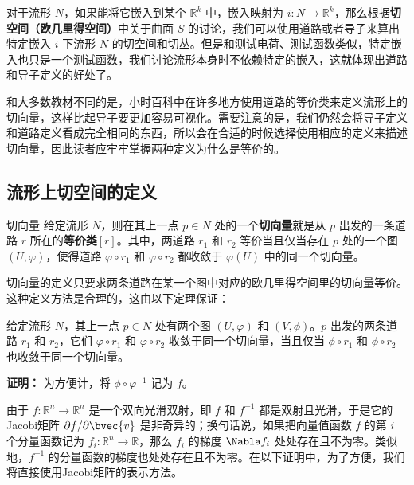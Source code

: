 



对于流形 $N$，如果能将它嵌入到某个 $\mathbb{R}^k$ 中，嵌入映射为 $i:N\rightarrow\mathbb{R}^k$，那么根据\textbf{切空间（欧几里得空间）}中关于曲面 $S$ 的讨论，我们可以使用道路或者导子来算出特定嵌入 $i$ 下流形 $N$ 的切空间和切丛。但是和测试电荷、测试函数类似，特定嵌入也只是一个测试函数，我们讨论流形本身时不依赖特定的嵌入，这就体现出道路和导子定义的好处了。

和大多数教材不同的是，小时百科中在许多地方使用道路的等价类来定义流形上的切向量，这样比起导子要更加容易可视化。需要注意的是，我们仍然会将导子定义和道路定义看成完全相同的东西，所以会在合适的时候选择使用相应的定义来描述切向量，因此读者应牢牢掌握两种定义为什么是等价的。

\subsection{流形上切空间的定义}

\begin{definition}{切向量}
给定流形 $N$，则在其上一点 $p\in N$ 处的一个\textbf{切向量}就是从 $p$ 出发的一条道路 $r$ 所在的\textbf{等价类}$[r]$。其中，两道路 $r_1$ 和 $r_2$ 等价当且仅当存在 $p$ 处的一个图 $(U, \varphi)$，使得道路 $\varphi\circ r_1$ 和 $\varphi\circ r_2$ 都收敛于 $\varphi(U)$ 中的同一个切向量。
\end{definition}

切向量的定义只要求两条道路在某一个图中对应的欧几里得空间里的切向量等价。这种定义方法是合理的，这由以下定理保证：

\begin{theorem}{}\label{the_tgSpa_1}
给定流形 $N$，其上一点 $p\in N$ 处有两个图 $(U, \varphi)$ 和 $(V, \phi)$。$p$ 出发的两条道路 $r_1$ 和 $r_2$，它们 $\varphi\circ r_1$ 和 $\varphi\circ r_2$ 收敛于同一个切向量，当且仅当 $\phi\circ r_1$ 和 $\phi\circ r_2$ 也收敛于同一个切向量。
\end{theorem}

\textbf{证明：}
为方便计，将 $\phi\circ\varphi^{-1}$ 记为 $f$。

由于 $f:\mathbb{R}^n\rightarrow\mathbb{R}^n$ 是一个双向光滑双射，即 $f$ 和 $f^{-1}$ 都是双射且光滑，于是它的Jacobi矩阵 $\partial f/\partial \bvec{v}$ 是非奇异的；换句话说，如果把向量值函数 $f$ 的第 $i$ 个分量函数记为 $f_i:\mathbb{R}^n\rightarrow\mathbb{R}$，那么 $f_i$ 的梯度 $\Nabla f_i$ 处处存在且不为零。类似地，$f^{-1}$ 的分量函数的梯度也处处存在且不为零。在以下证明中，为了方便，我们将直接使用Jacobi矩阵的表示方法。

